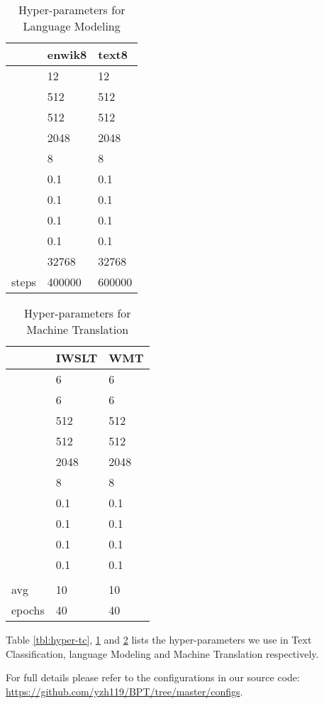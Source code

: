 \documentclass[11pt,a4paper]{article}
\begin{document}
\begin{table}[!htb]
\centering
\begin{tabular}{lll}
\toprule
          & enwik8 & text8 \\
\midrule
       & 12   & 12    \\
 & 512 & 512  \\
       & 512 & 512  \\
  & 2048 & 2048  \\
       & 8   & 8    \\
     & 0.1 & 0.1  \\
     & 0.1 & 0.1  \\
     & 0.1 & 0.1  \\
     & 0.1 & 0.1  \\
       & 32768 & 32768 \\
steps     & 400000 & 600000   \\
\bottomrule
\end{tabular}
\caption{Hyper-parameters for Language Modeling}
\label{tbl:hyper-lm}
\end{table}
\begin{table}[!htb]
\centering
\begin{tabular}{lll}
\toprule
          & IWSLT & WMT \\
\midrule
       & 6   & 6    \\
       & 6   & 6    \\
 & 512 & 512  \\
       & 512 & 512  \\
  & 2048 & 2048  \\
       & 8   & 8    \\
     & 0.1 & 0.1  \\
     & 0.1 & 0.1  \\
     & 0.1 & 0.1  \\
     & 0.1 & 0.1  \\
       &  &  \\
avg       & 10 & 10   \\
epochs    & 40 & 40   \\
\bottomrule
\end{tabular}
\caption{Hyper-parameters for Machine Translation}
\label{tbl:hyper-mt}
\end{table}

Table \ref{tbl:hyper-tc}, \ref{tbl:hyper-lm} and \ref{tbl:hyper-mt} lists the hyper-parameters we use in Text Classification, language Modeling and Machine Translation respectively.

For full details please refer to the configurations in our source code: \url{https://github.com/yzh119/BPT/tree/master/configs}.
\end{document}

